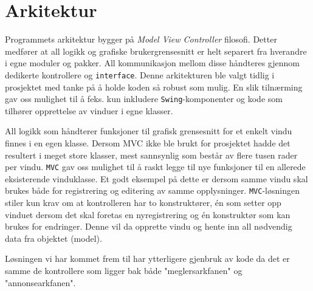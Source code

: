 \section{Arkitektur}
Programmets arkitektur bygger på \textit{Model View Controller} filosofi. Detter medfører at all logikk og grafiske brukergrensesnitt er helt separert fra hverandre i egne moduler og pakker. All kommunikasjon mellom disse håndteres gjennom dedikerte kontrollere og \texttt{interface}. Denne arkitekturen ble valgt tidlig i prosjektet med tanke på å holde koden så robust som mulig. En slik tilnærming gav oss mulighet til å feks. kun inkludere \texttt{Swing}-komponenter og kode som tilhører opprettelse av vinduer i egne klasser.

All logikk som håndterer funksjoner til grafisk grensesnitt for et enkelt vindu finnes i en egen klasse. Dersom MVC ikke ble brukt for prosjektet hadde det resultert i meget store klasser, mest sannsynlig som består av flere tusen rader per vindu. \texttt{MVC} gav oss mulighet til å raskt legge til nye funksjoner til en allerede eksisterende vinduklasse. Et godt eksempel på dette er dersom samme vindu skal brukes både for registrering og editering av samme opplysninger. \texttt{MVC}-løsningen stiler kun krav om at kontrolleren har to konstruktører, én som setter opp vinduet dersom det skal foretas en nyregistrering og én konstruktør som kan brukes for endringer. Denne vil da opprette vindu og hente inn all nødvendig data fra objektet (model). 

Løsningen vi har kommet frem til har ytterligere gjenbruk av kode da det er samme de kontrollere som ligger bak både "meglersarkfanen" og "annonsearkfanen".